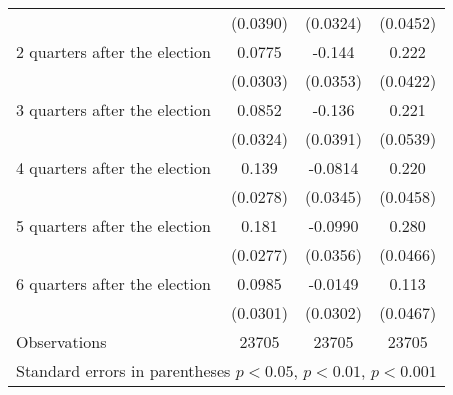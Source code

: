 \begin{table}[!ht]
\begin{tabular}{l*{3}{c}}
                    &    (0.0390)         &    (0.0324)         &    (0.0452)         \\
[0.5em]
 2 quarters after the election&      0.0775\sym{*}  &      -0.144\sym{***}&       0.222\sym{***}\\
                    &    (0.0303)         &    (0.0353)         &    (0.0422)         \\
[0.5em]
 3 quarters after the election&      0.0852\sym{**} &      -0.136\sym{***}&       0.221\sym{***}\\
                    &    (0.0324)         &    (0.0391)         &    (0.0539)         \\
[0.5em]
 4 quarters after the election&       0.139\sym{***}&     -0.0814\sym{*}  &       0.220\sym{***}\\
                    &    (0.0278)         &    (0.0345)         &    (0.0458)         \\
[0.5em]
 5 quarters after the election&       0.181\sym{***}&     -0.0990\sym{**} &       0.280\sym{***}\\
                    &    (0.0277)         &    (0.0356)         &    (0.0466)         \\
[0.5em]
 6 quarters after the election&      0.0985\sym{**} &     -0.0149         &       0.113\sym{*}  \\
                    &    (0.0301)         &    (0.0302)         &    (0.0467)         \\
\hline
Observations        &       23705         &       23705         &       23705         \\
\hline\hline
\multicolumn{4}{l}{ Standard errors in parentheses \sym{*} \(p<0.05\), \sym{**} \(p<0.01\), \sym{***} \(p<0.001\)}\\
\end{tabular}
\label{app_graph2_coef}
\end{table}
